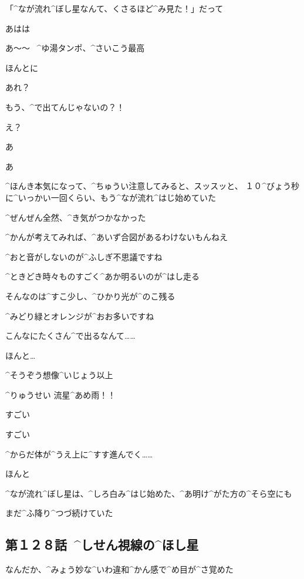 \Alpha 「^{なが}{流}れ^{ぼし}{星}なんて、くさるほど^{み}{見}た！」だって

\Kokone あはは

\page[106]
\Alpha あ〜〜
\ ^{ゆ}{湯}タンポ、^{さいこう}{最高}

\Kokone ほんとに

\page
\Alpha あれ？

\Alpha もう、^{で}{出}てんじゃないの？！

\Kokone え？

\Alpha あ

\Kokone あ

\page
\Alpha ^{ほんき}{本気}になって、^{ちゅうい}{注意}してみると、スッスッと、
１０^{びょう}{秒}に^{いっかい}{一回}くらい、もう^{なが}{流}れ^{はじ}{始}めていた

\Alpha ^{ぜんぜん}{全然}、^{き}{気}がつかなかった

\Alpha ^{かんが}{考}えてみれば、^{あいず}{合図}があるわけないもんねえ

\Kokone ^{おと}{音}がしないのが^{ふしぎ}{不思議}ですね

\page
\Alpha ^{ときどき}{時々}ものすごく^{あか}{明}るいのが^{はし}{走}る

\Alpha そんなのは^{すこ}{少}し、^{ひかり}{光}が^{のこ}{残}る

\Kokone ^{みどり}{緑}とオレンジが^{おお}{多}いですね

\Kokone こんなにたくさん^{で}{出}るなんて……

\Alpha ほんと…

\Alpha ^{そうぞう}{想像}^{いじょう}{以上}

\page[112]
\Alpha ^{りゅうせい }{流星}^{あめ}{雨}！！

\Alpha すごい

\Kokone すごい

\page
\Alpha ^{からだ}{体}が^{うえ}{上}に^{すす}{進}んでく……

\Kokone ほんと

\page
\Alpha ^{なが}{流}れ^{ぼし}{星}は、^{しろ}{白}み^{はじ}{始}めた、^{あ}{明}け^{がた}{方}の^{そら}{空}にも

\Alpha まだ^{ふ}{降}り^{つづ}{続}けていた


\subsection{第１２８話\ ^{しせん}{視線}の^{ほし}{星}}

\page[116]
\Alpha なんだか、^{みょう}{妙}な^{いわ}{違和}^{かん}{感}で^{め}{目}が^{さ}{覚}めた

